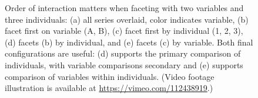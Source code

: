 \documentclass[12pt]{article}
\begin{document}
\begin{itemize}
\begin{center}
\begin{figure}[htp]
\caption{\label{fig:faceting-var-ind}Order of interaction matters when faceting with two variables and three individuals: (a) all series overlaid, color indicates variable, (b) facet first on variable (A, B),  (c) facet first by individual (1, 2, 3), (d) facets (b) by individual, and (e) facets (c) by variable. Both final configurations are useful: (d) supports the primary comparison of individuals, with variable comparisons secondary and (e) supports comparison of variables within individuals.  (Video footage illustration is available at \url{https://vimeo.com/112438919}.)}
\end{figure}

\end{center}





\end{itemize}
\end{document}
